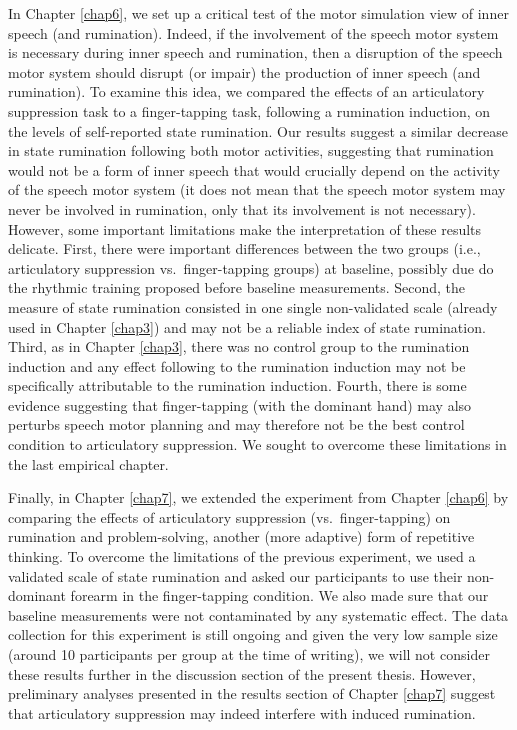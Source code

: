 \documentclass[a4paper,12pt,twoside,openright,oldfontcommands]{memoir}
\begin{document}
In Chapter \ref{chap6}, we set up a critical test of the motor simulation view of inner speech (and rumination). Indeed, if the involvement of the speech motor system is necessary during inner speech and rumination, then a disruption of the speech motor system should disrupt (or impair) the production of inner speech (and rumination). To examine this idea, we compared the effects of an articulatory suppression task to a finger-tapping task, following a rumination induction, on the levels of self-reported state rumination. Our results suggest a similar decrease in state rumination following both motor activities, suggesting that rumination would not be a form of inner speech that would crucially depend on the activity of the speech motor system (it does not mean that the speech motor system may never be involved in rumination, only that its involvement is not necessary). However, some important limitations make the interpretation of these results delicate. First, there were important differences between the two groups (i.e., articulatory suppression vs.~finger-tapping groups) at baseline, possibly due do the rhythmic training proposed before baseline measurements. Second, the measure of state rumination consisted in one single non-validated scale (already used in Chapter \ref{chap3}) and may not be a reliable index of state rumination. Third, as in Chapter \ref{chap3}, there was no control group to the rumination induction and any effect following to the rumination induction may not be specifically attributable to the rumination induction. Fourth, there is some evidence suggesting that finger-tapping (with the dominant hand) may also perturbs speech motor planning and may therefore not be the best control condition to articulatory suppression. We sought to overcome these limitations in the last empirical chapter.

Finally, in Chapter \ref{chap7}, we extended the experiment from Chapter \ref{chap6} by comparing the effects of articulatory suppression (vs.~finger-tapping) on rumination and problem-solving, another (more adaptive) form of repetitive thinking. To overcome the limitations of the previous experiment, we used a validated scale of state rumination and asked our participants to use their non-dominant forearm in the finger-tapping condition. We also made sure that our baseline measurements were not contaminated by any systematic effect. The data collection for this experiment is still ongoing and given the very low sample size (around 10 participants per group at the time of writing), we will not consider these results further in the discussion section of the present thesis. However, preliminary analyses presented in the results section of Chapter \ref{chap7} suggest that articulatory suppression may indeed interfere with induced rumination.
\end{document}
